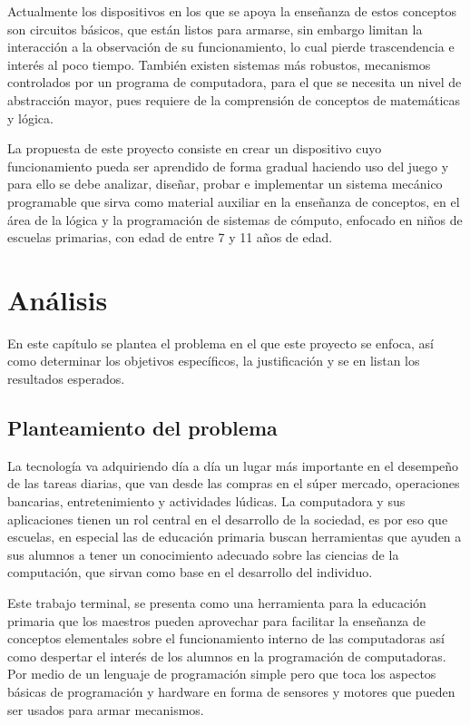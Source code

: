 \documentclass[letterpaper,10pt]{article}
\begin{document}
Actualmente los dispositivos en los que se apoya la enseñanza de estos 
conceptos son circuitos básicos, que están listos para armarse, sin embargo 
limitan la interacción a la observación de su funcionamiento, 
lo cual pierde trascendencia e interés al poco tiempo. También existen 
sistemas más robustos, mecanismos controlados por un programa de computadora, 
para el que se necesita un nivel de abstracción mayor, 
pues requiere de la comprensión de conceptos de matemáticas y lógica.
\newline

La propuesta de este proyecto consiste en crear un dispositivo cuyo 
funcionamiento pueda ser aprendido de forma gradual 
haciendo uso del juego y para ello se debe analizar, 
diseñar, probar e implementar un sistema mecánico programable que sirva como 
material auxiliar en la enseñanza de conceptos, en el área de la lógica
y la programación de sistemas de cómputo, enfocado en niños de escuelas primarias,
con edad de entre 7 y 11 años de edad.
\newpage

\section{Análisis}
En este capítulo se plantea el problema en el que este proyecto se enfoca, así como
determinar los objetivos específicos, la justificación y se en listan los resultados esperados.
\newline

\subsection{Planteamiento del problema}

La tecnología va adquiriendo día a día un lugar más importante en el
desempeño de las tareas diarias, que van desde las compras en el súper mercado,
operaciones bancarias, entretenimiento y actividades lúdicas. La computadora 
y sus aplicaciones tienen un rol central en el desarrollo de la sociedad, 
es por eso que escuelas, en especial las de educación primaria
buscan herramientas que ayuden a sus alumnos a tener un conocimiento adecuado 
sobre las ciencias de la computación, que sirvan como base en el desarrollo
del individuo.
\newline

Este trabajo terminal, se presenta como una herramienta para la educación primaria 
que los maestros pueden aprovechar para facilitar la enseñanza de conceptos
elementales sobre el funcionamiento interno de las computadoras así como 
despertar el interés de los alumnos en la programación de computadoras.
Por medio de un lenguaje de programación simple pero que toca los aspectos 
básicas de programación y hardware en forma de sensores y motores que pueden
ser usados para armar mecanismos.
\end{document}
